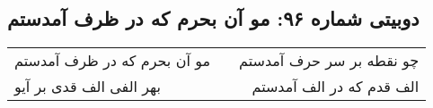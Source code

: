 \begin{center}
\section*{دوبیتی شماره ۹۶: مو آن بحرم که در ظرف آمدستم}
\label{sec:096}
\begin{longtable}{l p{0.5cm} r}
مو آن بحرم که در ظرف آمدستم
&&
چو نقطه بر سر حرف آمدستم
\\
بهر الفی الف قدی بر آیو
&&
الف قدم که در الف آمدستم
\\
\end{longtable}
\end{center}
